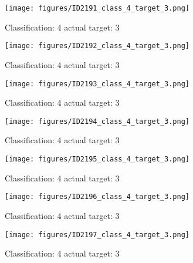 \begin{figure}[h!]
\begin{center}
\texttt{[image: figures/ID2191\_class\_4\_target\_3.png]}
\end{center}
\caption{ Classification: 4 actual target: 3}
\label{fig:ID2191_class_4_target_3}
\end{figure}
\begin{figure}[h!]
\begin{center}
\texttt{[image: figures/ID2192\_class\_4\_target\_3.png]}
\end{center}
\caption{ Classification: 4 actual target: 3}
\label{fig:ID2192_class_4_target_3}
\end{figure}
\begin{figure}[h!]
\begin{center}
\texttt{[image: figures/ID2193\_class\_4\_target\_3.png]}
\end{center}
\caption{ Classification: 4 actual target: 3}
\label{fig:ID2193_class_4_target_3}
\end{figure}
\begin{figure}[h!]
\begin{center}
\texttt{[image: figures/ID2194\_class\_4\_target\_3.png]}
\end{center}
\caption{ Classification: 4 actual target: 3}
\label{fig:ID2194_class_4_target_3}
\end{figure}
\begin{figure}[h!]
\begin{center}
\texttt{[image: figures/ID2195\_class\_4\_target\_3.png]}
\end{center}
\caption{ Classification: 4 actual target: 3}
\label{fig:ID2195_class_4_target_3}
\end{figure}
\begin{figure}[h!]
\begin{center}
\texttt{[image: figures/ID2196\_class\_4\_target\_3.png]}
\end{center}
\caption{ Classification: 4 actual target: 3}
\label{fig:ID2196_class_4_target_3}
\end{figure}
\begin{figure}[h!]
\begin{center}
\texttt{[image: figures/ID2197\_class\_4\_target\_3.png]}
\end{center}
\caption{ Classification: 4 actual target: 3}
\label{fig:ID2197_class_4_target_3}
\end{figure}

